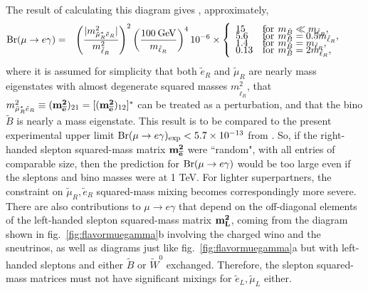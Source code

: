 \documentclass[11pt]{article}
\def\beq{\begin{eqnarray}}
\def\eeq{\end{eqnarray}}
\def\sbar{\overline}
\def\stilde{\widetilde}
\def\Branching{{\rm Br}}
\begin{document}
The result of calculating this diagram gives \cite{muegamma,muegammatwo},
approximately,
\beq 
\Branching (\mu \rightarrow e \gamma) 
&=& 
\left ( \frac{ |m^2_{\tilde \mu^*_R \tilde e_R}| }{m^2_{\tilde \ell_R}} 
\right )^2
\left (\frac{100\>{\rm GeV}}{m_{\tilde \ell_R}} \right )^4 
10^{-6} \times
\left \{ \begin{array}{ll}
15 & {\rm for}\>\, m_{\tilde B} \ll m_{\tilde \ell_R},
\\[-5pt]
5.6 & {\rm for}\>\, m_{\tilde B} = 0.5 m_{\tilde \ell_R},
\\[-5pt]
1.4 & {\rm for}\>\, m_{\tilde B} = m_{\tilde \ell_R},
\\[-5pt]
0.13 & {\rm for}\>\, m_{\tilde B} = 2 m_{\tilde \ell_R},
\end{array}
\right. 
\phantom{xxx}
\label{eq:muegamma}
\eeq
where it is assumed for simplicity that both $\tilde e_R$ and $\tilde
\mu_R$ are nearly mass eigenstates with almost degenerate squared masses
$m^2_{\tilde \ell_R}$, that $m^2_{\tilde \mu_R^* \tilde e_R} \equiv ({\bf
m^2_{\sbar e}})_{21} = [({\bf m^2_{\sbar e}})_{12}]^*$ can be treated as a
perturbation, and that the bino $\stilde B$ is nearly a mass eigenstate. This
result is to be compared to the present experimental upper limit 
$\Branching (\mu \rightarrow e \gamma)_{\rm exp} < 5.7\times 10^{-13}$ from
\cite{muegammaexperiment}. So, if the right-handed slepton squared-mass
matrix ${\bf m^2_{\sbar e}}$ were ``random", with all entries of
comparable size, then the prediction for $\Branching (\mu\rightarrow e\gamma)$
would be too large even if the sleptons and bino masses were at 1 TeV. 
For lighter superpartners, the constraint on $\tilde \mu_R, \tilde e_R$
squared-mass mixing becomes correspondingly more severe. There are also
contributions to $\mu \rightarrow e \gamma$ that depend on the
off-diagonal elements of the left-handed slepton squared-mass matrix $\bf
m^2_L$, coming from the 
diagram shown in fig.~\ref{fig:flavormuegamma}b 
involving the charged wino and the sneutrinos, as well as
diagrams just like fig.~\ref{fig:flavormuegamma}a but with left-handed
sleptons and either $\stilde B$ or $\stilde W^0$ exchanged.
Therefore, the slepton
squared-mass matrices must not have significant mixings for $\stilde
e_L,\stilde\mu_L$ either. 
\end{document}
